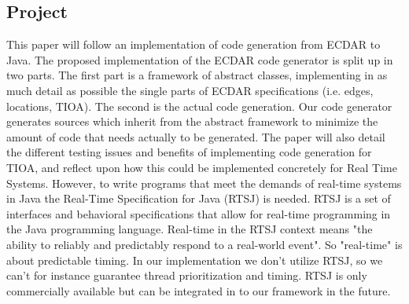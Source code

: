 \subsection{Project}
\label{introduction-problemfield}
This paper will follow an implementation of code generation from ECDAR to
Java. The proposed implementation of the ECDAR code generator is split up in two
parts. The first part is a framework of abstract classes, implementing in as
much detail as possible the single parts of ECDAR specifications (i.e. edges,
locations, TIOA). The second is the actual code generation. Our code generator
generates sources which inherit from the abstract framework to minimize the
amount of code that needs actually to be generated. The paper will also detail
the different testing issues and benefits of implementing code generation for
TIOA, and reflect upon how this could be implemented concretely for Real Time
Systems.  However, to write programs that meet the demands of real-time systems 
in Java the Real-Time Specification for Java (RTSJ) is needed. RTSJ is a set of interfaces 
and behavioral specifications that allow for real-time programming in the Java programming language. 
Real-time in the RTSJ context means "the ability to reliably and predictably respond to a real-world event". 
So "real-time" is about predictable timing. In our implementation we don't utilize RTSJ, so we can't for instance 
guarantee thread prioritization and timing. RTSJ is only commercially available but can be integrated in to our framework in the future.